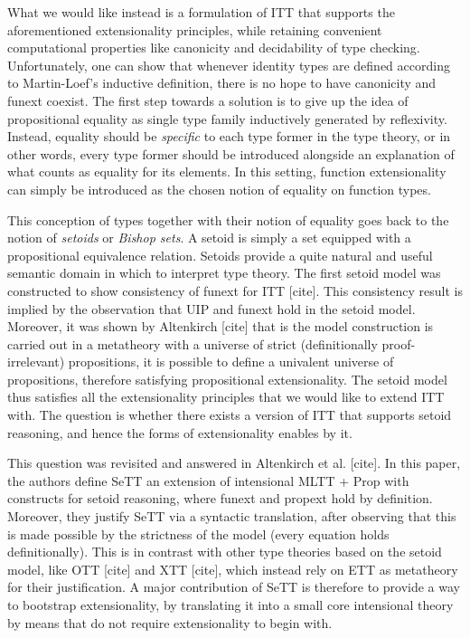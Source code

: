 \documentclass{easychair}
\begin{document}
What we would like instead is a formulation of ITT that supports the
aforementioned extensionality principles, while retaining convenient
computational properties like canonicity and decidability of type checking.
%
Unfortunately, one can show that whenever identity types are defined according
to Martin-Loef's inductive definition, there is no hope to have canonicity and
funext coexist.
%
The first step towards a solution is to give up the idea of propositional
equality as single type family inductively generated by reflexivity. Instead,
equality should be \emph{specific} to each type former in the type theory, or in
other words, every type former should be introduced alongside an explanation of
what counts as equality for its elements. In this setting, function
extensionality can simply be introduced as the chosen notion of equality on
function types.

This conception of types together with their notion of equality goes back to the
notion of \emph{setoids} or \emph{Bishop sets}. A setoid is simply a set
equipped with a propositional equivalence relation. Setoids provide a quite
natural and useful semantic domain in which to interpret type theory. The first
setoid model was constructed to show consistency of funext for ITT [cite]. This
consistency result is implied by the observation that UIP and funext hold in the
setoid model. Moreover, it was shown by Altenkirch [cite] that is the model
construction is carried out in a metatheory with a universe of strict
(definitionally proof-irrelevant) propositions, it is possible to define a
univalent universe of propositions, therefore satisfying propositional
extensionality. The setoid model thus satisfies all the extensionality
principles that we would like to extend ITT with. The question is whether there
exists a version of ITT that supports setoid reasoning, and hence the forms of
extensionality enables by it.

This question was revisited and answered in Altenkirch et al. [cite]. In this
paper, the authors define SeTT an extension of intensional MLTT + Prop with
constructs for setoid reasoning, where funext and propext hold by
definition. Moreover, they justify SeTT via a syntactic translation, after
observing that this is made possible by the strictness of the model (every
equation holds definitionally). This is in contrast with other type theories
based on the setoid model, like OTT [cite] and XTT [cite], which instead rely on
ETT as metatheory for their justification. A major contribution of SeTT is
therefore to provide a way to bootstrap extensionality, by translating it into a
small core intensional theory by means that do not require extensionality to
begin with.
\end{document}
